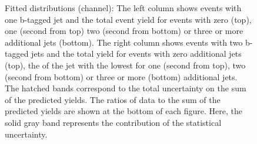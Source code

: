 \begin{figure}[htbp!]
\begin{center}

\caption{Fitted distributions (\ee channel): 
  The left column shows events with one b-tagged jet and the total event yield for events with zero (top), one (second from top)
  two (second from bottom) or three or more additional jets (bottom).
  The right column shows events with two b-tagged jets and the total yield for events with zero additional jets (top),
 the \pt of the jet with the lowest \pt for one (second from top),
  two (second from bottom) or three or more (bottom) additional jets.
  The hatched bands correspond to the total uncertainty on the sum of
  the predicted yields. The ratios of data to the sum of the
  predicted yields are shown at the bottom of each figure. Here, the solid
  gray band represents the contribution of the statistical uncertainty.  
       \label{fig:lh_ee_postfitdistr8}}
  \end{center}
\end{figure}

